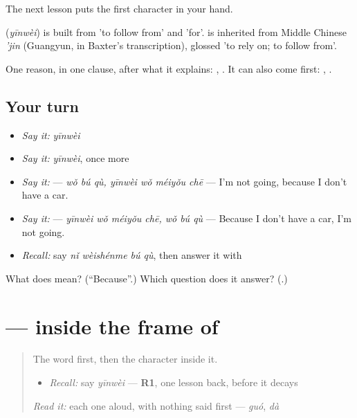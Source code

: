 The next lesson puts the first character in your hand.

\begin{cousinweb}
\textbf{} (\emph{yīnwèi}) is built from  'to follow from' and  'for'.  is inherited from Middle Chinese \emph{'jin} (Guangyun, in Baxter's transcription), glossed 'to rely on; to follow from'.
\end{cousinweb}

\begin{grammarlens}[title={What you've built}]
One reason, in one clause, after what it explains: , . It can also come first: , .
\end{grammarlens}

\subsection*{Your turn}
\begin{itemize}
\raggedright
  \item \emph{Say it:} \emph{yīnwèi}
  \item \emph{Say it:} \emph{yīnwèi}, once more
  \item \emph{Say it:}   — \emph{wǒ bú qù, yīnwèi wǒ méiyǒu chē} — I'm not going, because I don't have a car.
  \item \emph{Say it:}   — \emph{yīnwèi wǒ méiyǒu chē, wǒ bú qù} — Because I don't have a car, I'm not going.
  \item \emph{Recall:} say \emph{nǐ wèishénme bú qù}, then answer it with 
\end{itemize}

\begin{tcolorbox}[breakable,colback=teal!4,colframe=teal!35!black,title={Before you move on}]
What does  mean? (\textquotedblleft{}Because\textquotedblright{}.) Which question does it answer? (\textbf{}.)
\end{tcolorbox}
\section[\texorpdfstring{\zh{因} (yīn)}{因 (yīn)}]{ —  inside the frame of }

\label{lesson:ZH-W96-yin}



\begin{quote}
The word first, then the character inside it.

\begin{itemize}
\raggedright
  \item \emph{Recall:} say \emph{yīnwèi} — \textbf{R1}, one lesson back, before it decays
\end{itemize}

\begin{quote}
 
\end{quote}

\emph{Read it:} each one aloud, with nothing said first — \emph{guó}, \emph{dà}
\end{quote}

